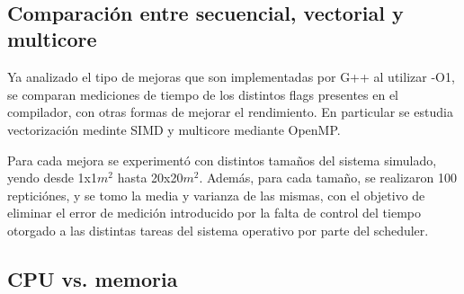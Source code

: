 ~\\



\subsection{Comparación entre secuencial, vectorial y multicore}
Ya analizado el tipo de mejoras que son implementadas por G++ al utilizar -O1, se comparan mediciones de tiempo de los distintos flags presentes en el compilador, con otras formas de mejorar el rendimiento. En particular se estudia vectorización medinte SIMD y multicore mediante OpenMP.

Para cada mejora se experimentó con distintos tamaños del sistema simulado, yendo desde 1x1$m^2$ hasta 20x20$m^2$. Además, para cada tamaño, se realizaron 100 repticiónes, y se tomo la media y varianza de las mismas, con el objetivo de eliminar el error de medición introducido por la falta de control del tiempo otorgado a las distintas tareas del sistema operativo por parte del scheduler.



\subsection{CPU vs. memoria}

